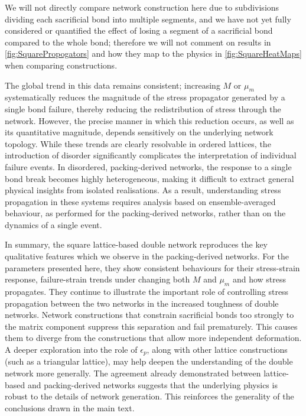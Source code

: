 \documentclass[asymmetricmargins]{library/duthesis}%
\begin{document}
\begin{subappendices}
We will not directly compare network construction here due to subdivisions dividing each sacrificial bond into multiple segments, and we have not yet fully considered or quantified the effect of losing a segment of a sacrificial bond compared to the whole bond; therefore we will not comment on results in \cref{fig:SquarePropogators} and how they map to the physics in \cref{fig:SquareHeatMaps} when comparing constructions. 

The global trend in this data remains consistent; increasing $M$ or $\mu_m$ systematically reduces the magnitude of the stress propagator generated by a single bond failure, thereby reducing the redistribution of stress through the network. However, the precise manner in which this reduction occurs, as well as its quantitative magnitude, depends sensitively on the underlying network topology. While these trends are clearly resolvable in ordered lattices, the introduction of disorder significantly complicates the interpretation of individual failure events. In disordered, packing-derived networks, the response to a single bond break becomes highly heterogeneous, making it difficult to extract general physical insights from isolated realisations. As a result, understanding stress propagation in these systems requires analysis based on ensemble-averaged behaviour, as performed for the packing-derived networks, rather than on the dynamics of a single event.

In summary, the square lattice-based double network reproduces the key qualitative features which we observe in the packing-derived networks. For the parameters presented here, they show consistent behaviours for their stress-strain response, failure-strain trends under changing both $M$ and $\mu_m$ and how stress propagates. They continue to illustrate the important role of controlling stress propagation between the two networks in the increased toughness of double networks. Network constructions that constrain sacrificial bonds too strongly to the matrix component suppress this separation and fail prematurely. This causes them to diverge from the constructions that allow more independent deformation. A deeper exploration into the role of $\epsilon_p$, along with other lattice constructions (such as a triangular lattice), may help deepen the understanding of the double network more generally. The agreement already demonstrated between lattice-based and packing-derived networks suggests that the underlying physics is robust to the details of network generation. This reinforces the generality of the conclusions drawn in the main text.


\end{subappendices}
\end{document}
